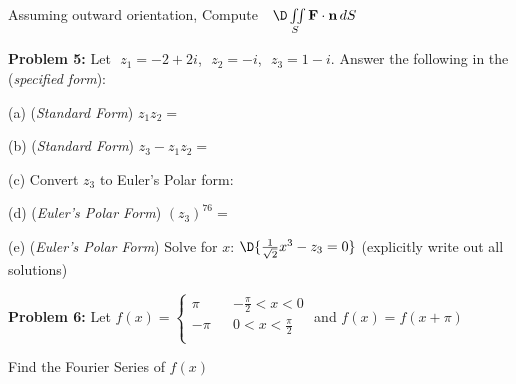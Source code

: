 \documentclass[12pt]{amsart}
\numberwithin{equation}{section}
\begin{document}
\noindent
Assuming outward orientation, Compute \,\, $\D \iint \limits_{S} {\bf F} \cdot {\bf n} \, dS$

\vspace{0.2cm}

\thispagestyle{empty}
\newpage
\thispagestyle{empty}

\noindent
{\bf Problem 5:} Let \,\,$z_1 = -2+2i$,\,\, $z_2 = -i$,\,\, $z_3 = 1-i$. \quad Answer the following in the ({\em specified form}):

\vspace{0.2cm}

(a) ({\em Standard Form}) $z_1z_2 = $

\vspace{2.8cm}

(b) ({\em Standard Form}) $z_3-z_1z_2 = $

\vspace{2.8cm}

(c) Convert $z_3$ to Euler's Polar form:

\vspace{3.8cm}

(d) ({\em Euler's Polar Form})  $(z_3)^{76} = $

\vspace{3.8cm}

(e) ({\em Euler's Polar Form}) Solve for $x$: \quad $\D{\frac{1}{\sqrt{2}}x^3 - z_3 = 0}$ \quad (explicitly write out all solutions)

\thispagestyle{empty}
\newpage
\thispagestyle{empty}

\noindent
{\bf Problem 6:} Let \quad
$
f(x) = 
\left\{
\begin{array}{lrc}
	 \pi & & -\frac{\pi}{2} < x < 0\\
	-\pi & & 0  < x < \frac{\pi}{2}\\
\end{array}
\right.
$  \quad and \quad $f(x) = f(x+\pi)$

\vspace{0.1cm}

Find the Fourier Series of $f(x)$ 

\thispagestyle{empty}
\newpage
\thispagestyle{empty}

%
%
%
\thispagestyle{empty}
\end{document}
